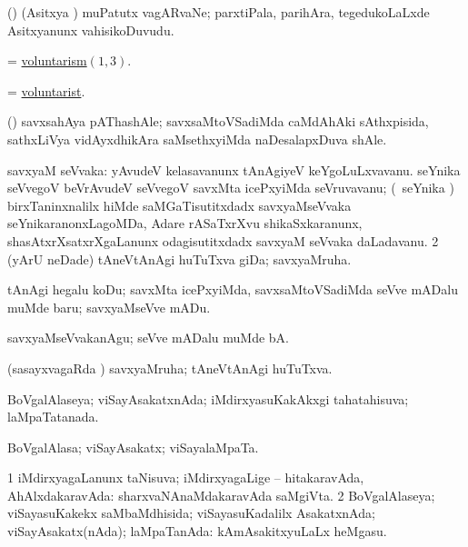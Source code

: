 \bentry
{}
\gl{\nA}
\expl{}
\bmng
 (\nAyxshA) (Asitxya \vi) muPatutx vagARvaNe; parxtiPala, parihAra, tegedukoLaLxde Asitxyanunx vahisikoDuvudu. 
\emng
\eentry

\bentry
{} 
\gl{\nA}
\expl{}
\bmng
 = \hyperlink{voluntarism(1)}{voluntarism\((1, 3)\)}. 
\emng
\eentry

\bentry 
{} 
\gl{\nA}
\expl{}
\bmng
 = \hyperlink{voluntarist}{voluntarist}. 
\emng
\eentry

\bentry 
{}
\gl{\nA}
\expl{}
\bmng
 (\birx) savxsahAya pAThashAle; savxsaMtoVSadiMda caMdAhAki sAthxpisida, sathxLiVya vidAyxdhikAra saMsethxyiMda naDesalapxDuva shAle. 
\emng
\eentry

\bentry 
{} 
\gl{\nA}
\expl{}
\bmng
\bnum
{} savxyaM seVvaka: 
\banum
{} yAvudeV kelasavanunx tAnAgiyeV keYgoLuLxvavanu. 
 seYnika seVvegoV beVrAvudeV seVvegoV savxMta icePxyiMda seVruvavanu; (\kanmu\ seYnika \ca) birxTaninxnalilx hiMde saMGaTisutitxdadx savxyaMseVvaka seYnikaranonxLagoMDa, Adare rASaTxrXvu shikaSxkaranunx, shasAtxrXsatxrXgaLanunx odagisutitxdadx savxyaM seVvaka daLadavanu. 
\eanum
\numie
\num{2} (yArU neDade) tAneVtAnAgi huTuTxva giDa; savxyaMruha. 
\enum
\emng
\eentry

\bentry
{} 
\gl{\sakirx}
\expl{}
\bmng
 tAnAgi hegalu koDu; savxMta icePxyiMda, savxsaMtoVSadiMda seVve mADalu muMde baru; savxyaMseVve mADu. 
\emng

\noindent 
\gl{\akirx}
\expl{}
\bmng
 savxyaMseVvakanAgu; seVve mADalu muMde bA. 
\emng
\eentry

\bentry 
{} 
\gl{\gu}
\expl{}
\bmng
 (sasayxvagaRda \vi) savxyaMruha; tAneVtAnAgi huTuTxva. 
\emng
\eentry

\bentry 
{} 
\gl{\gu}
\expl{}
\bmng
 BoVgalAlaseya; viSayAsakatxnAda; iMdirxyasuKakAkxgi tahatahisuva; laMpaTatanada. 
\emng
\eentry

\bentry 
{} 
\gl{\nA}
\bmng
 BoVgalAlasa; viSayAsakatx; viSayalaMpaTa. 
\emng
\eentry

\bentry 
{} 
\gl{\gu}
\expl{}
\bmng
\bnum
\num{1} iMdirxyagaLanunx taNisuva; iMdirxyagaLige -- hitakaravAda, AhAlxdakaravAda:  sharxvaNAnaMdakaravAda saMgiVta. 
\num{2} BoVgalAlaseya; viSayasuKakekx saMbaMdhisida; viSayasuKadalilx AsakatxnAda; viSayAsakatx(nAda); laMpaTanAda:  kAmAsakitxyuLaLx heMgasu. 
\enum
\emng
\eentry

